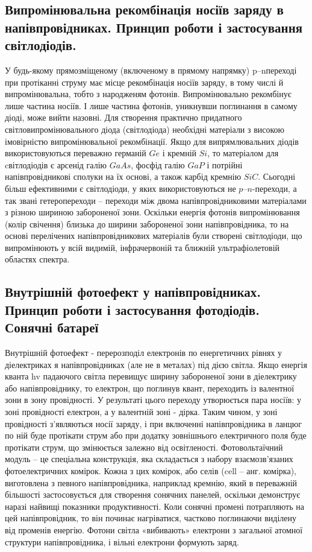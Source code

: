 \subsection{Випромінювальна рекомбінація носіїв заряду в напівпровідниках.
Принцип роботи і застосування світлодіодів.}
У будь-якому прямозміщеному (включеному в прямому напрямку) p–nпереході при протіканні струму має місце рекомбінація носіїв заряду, в
тому числі й випромінювальна, тобто з народженям фотонів.
Випромінювально рекомбінує лише частина носіїв. І лише частина
фотонів, уникнувши поглинання в самому діоді, може вийти назовні. Для
створення практично придатного світловипромінювального діода
(світлодіода) необхідні матеріали з
високою імовірністю випромінювальної рекомбінації. Якщо для випрямлювальних діодів використовуються переважно германій $Ge$ і
кремній $Si$, то матеріалом для cвітлодіодів є арсенід галію $GaAs$, фосфід
галію $GaP$ і потрійні напівпровідникові сполуки на їх основі, а також
карбід кремнію $SiC$. Сьогодні більш ефективними є світлодіоди, у яких
використовуються не $p$–$n$-переходи, а так звані гетеропереходи – переходи
між двома напівпровідниковими матеріалами з різною шириною
забороненої зони. Оскільки енергія фотонів випромінювання (колір
свічення) близька до ширини забороненої зони напівпровідника, то на
основі перелічених напівпровідникових матеріалів були створені
світлодіоди, що випромінюють у всій видимій, інфрачервоній та ближній
ультрафіолетовій областях спектра.
\subsection{Внутрішній фотоефект у напівпровідниках. Принцип роботи і
застосування фотодіодів. Сонячні батареї}
Внутрішній фотоефект -
перерозподіл електронів по енергетичних рівнях у діелектриках я
напівпровідниках (але не в металах) під дією світла. Якщо енергія кванта
hv падаючого світла перевищує ширину забороненої зони в діелектрику
або напівпровіднику, то електрон, що поглинув квант, переходить із
валентної зони в зону провідності. У результаті цього переходу
утворюється пара носіїв: у зоні провідності електрон, а у валентній зоні -
дірка. Таким чином, у зоні провідності з'являються носії заряду, і при
включенні напівпровідника в ланцюг по ній буде протікати струм або при
додатку зовнішнього електричного поля буде протікати струм, що
змінюється залежно від освітленості. Фотовольтаїчний модуль – це
спеціальна конструкція, яка складається з набору взаємозв’язаних
фотоелектричних комірок. Кожна з цих комірок, або селів (cell – анг.
комірка), виготовлена з певного напівпровідника, наприклад кремнію,
який в переважній більшості застосовується для створення сонячних
панелей, оскільки демонструє наразі найвищі показники продуктивності.
Коли сонячні промені потрапляють на цей напівпровідник, то він починає
нагріватися, частково поглинаючи виділену від променів енергію. Фотони
світла «вибивають» електрони з загальної атомної структури напівпровідника, і вільні електрони формують заряд.
